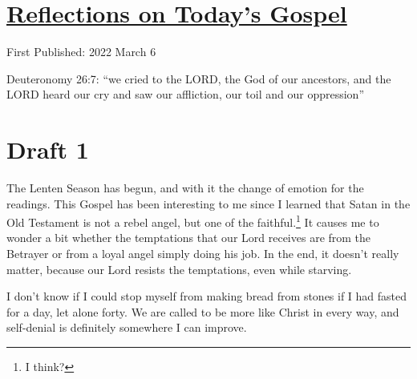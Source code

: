 \documentclass[12pt]{article}[titlepage]
\newcommand{\say}[1]{``#1''}
\renewcommand{\,}{\textsuperscript{,}}
\begin{document}
\doublespacing
\section{\href{reflections-on-readings-1-lent-c-2022.html}{Reflections on Today's Gospel}}
First Published: 2022 March 6

Deuteronomy 26:7: \say{we cried to the LORD, the God of our ancestors, and the LORD heard our cry and saw our affliction, our toil and our oppression}

\section{Draft 1}
The Lenten Season has begun, and with it the change of emotion for the readings.
This Gospel has been interesting to me since I learned that Satan in the Old Testament is not a rebel angel, but one of the faithful.\footnote{I think?}
It causes me to wonder a bit whether the temptations that our Lord receives are from the Betrayer or from a loyal angel simply doing his job.
In the end, it doesn't really matter, because our Lord resists the temptations, even while starving.

I don't know if I could stop myself from making bread from stones if I had fasted for a day, let alone forty.
We are called to be more like Christ in every way, and self-denial is definitely somewhere I can improve.
\end{document}
